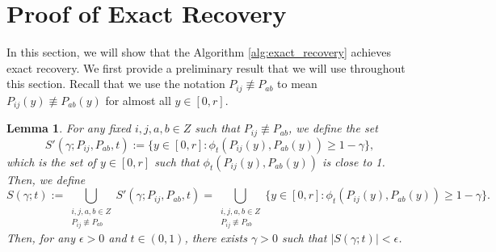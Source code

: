 \documentclass{article}
\newcommand{\1}{\mathbbm{1}}
\theoremstyle{definition}
\theoremstyle{plain}
\newtheorem{lemma}{Lemma}
\begin{document}
\section{Proof of Exact Recovery}
\label{appx:proof_of_exact_recovery}
In this section, we will show that the Algorithm \ref{alg:exact_recovery} achieves exact recovery. We first provide a preliminary result that we will use throughout this section. Recall that we use the notation $P_{ij} \not \equiv P_{ab}$ to mean $P_{ij}(y) \not \equiv P_{ab}(y)$ for almost all $y \in [0, r]$.
\begin{lemma}
\label{lem:phi_property}  
    For any fixed $i, j, a, b \in Z$ such that $P_{ij} \not \equiv P_{ab}$, we define the set
    \begin{equation}
    \label{eq:def_S_prime}
        S'(\gamma; P_{ij}, P_{ab}, t) :=  \{y \in [0, r] : \phi_t(P_{ij}(y), P_{ab}(y) ) \geq 1 - \gamma\},
    \end{equation}
    which is the set of $y \in [0, r]$ such that $\phi_t(P_{ij}(y), P_{ab}(y))$ is close to 1. Then, we define
    \begin{equation}
    \label{eq:def_S}
        S(\gamma; t) := \bigcup_{\substack{i,j,a,b \in Z \\ P_{ij} \not \equiv P_{ab}}} S'(\gamma; P_{ij}, P_{ab}, t) = \bigcup_{\substack{i,j,a,b \in Z \\ P_{ij} \not \equiv P_{ab}}} \{y \in [0, r] : \phi_t(P_{ij}(y), P_{ab}(y) ) \geq 1 - \gamma\}.
    \end{equation}
    Then, for any $\epsilon > 0$ and $t \in (0, 1)$, there exists $\gamma > 0$ such that $|S(\gamma;t)| < \epsilon$.
\end{lemma}
\end{document}
